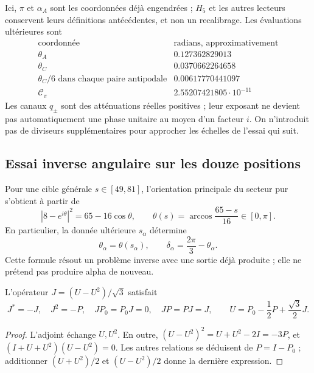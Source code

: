 Ici, \(\pi\) et \(\alpha_A\) sont les coordonnées déjà engendrées ;
\(H_5\) et les autres lecteurs conservent leurs définitions
antécédentes, et non un recalibrage. Les évaluations ultérieures sont
\[
\begin{array}{c|c}
 \text{coordonnée}&\text{radians, approximativement}\\\hline
 \theta_A&0.127362829013\\
 \theta_C&0.0370662264658\\
 \theta_C/6\text{ dans chaque paire antipodale}&0.00617770441097\\
 \mathcal C_\pi&2.55207421805\cdot10^{-11}
\end{array}
\]
Les canaux \(q_\pm\) sont des atténuations réelles positives ; leur exposant
ne devient pas automatiquement une phase unitaire au moyen d’un facteur
\(i\). On n’introduit pas de diviseurs supplémentaires pour approcher les
échelles de l’essai qui suit.

\subsection{Essai inverse angulaire sur les douze positions}
\label{lib02:ensayo-angular}

Pour une cible générale \(s\in[49,81]\), l'orientation principale du secteur pur s'obtient à partir de
\[
 |8-e^{i\theta}|^2=65-16\cos\theta,
 \qquad \theta(s)=\arccos\frac{65-s}{16}\in[0,\pi].
\]
En particulier, la donnée ultérieure \(s_\alpha\) détermine
\[
 \theta_\alpha=\theta(s_\alpha),\qquad
 \delta_\alpha=\frac{2\pi}{3}-\theta_\alpha.
\]
Cette formule résout un problème inverse avec une sortie déjà produite ;
elle ne prétend pas produire alpha de nouveau.

\begin{lemma}
\label{lib02:J}
L'opérateur \(J=(U-U^2)/\sqrt3\) satisfait
\[
 J^*=-J,\quad J^2=-P,\quad JP_0=P_0J=0,\quad JP=PJ=J,
 \qquad U=P_0-\frac12P+\frac{\sqrt3}{2}J.
\]
\end{lemma}
\begin{proof}
L’adjoint échange \(U,U^2\). En outre,
\((U-U^2)^2=U+U^2-2I=-3P\), et
\((I+U+U^2)(U-U^2)=0\). Les autres relations se déduisent de
\(P=I-P_0\) ; additionner \((U+U^2)/2\) et \((U-U^2)/2\)
donne la dernière expression.
\end{proof}

